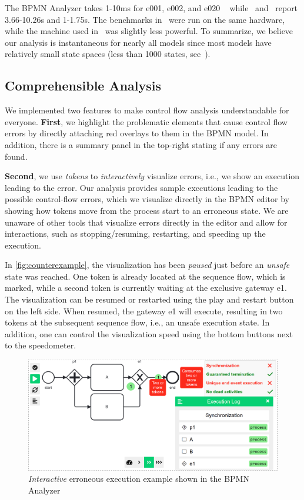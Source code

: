 \documentclass[
twocolumn
]{ceurart}
\begin{document}
The BPMN Analyzer takes 1-10ms for e001, e002, and e020 ~\cite{krauterInstantaneousComprehensibleFixable2024} while~\cite{houhouFirstOrderLogicVerification2022} and~\cite{krauterFormalizationAnalysisBPMN2023} report 3.66-10.26s and 1-1.75s.
The benchmarks in~\cite{krauterFormalizationAnalysisBPMN2023} were run on the same hardware, while the machine used in~\cite{houhouFirstOrderLogicVerification2022} was slightly less powerful.
To summarize, we believe our analysis is instantaneous for nearly all models since most models have relatively small state spaces (less than 1000 states, see~\cite{fahlandAnalysisDemandInstantaneous2011}).

\subsection{Comprehensible Analysis}
We implemented two features to make control flow analysis understandable for everyone. 
\textbf{First}, we highlight the problematic elements that cause control flow errors by directly attaching red overlays to them in the BPMN model.
In addition, there is a summary panel in the top-right stating if any errors are found.

\textbf{Second}, we use \textit{tokens} to \textit{interactively} visualize errors, i.e., we show an execution leading to the error.
Our analysis provides sample executions leading to the possible control-flow errors, which we visualize directly in the BPMN editor by showing how tokens move from the process start to an erroneous state.
We are unaware of other tools that visualize errors directly in the editor and allow for interactions, such as stopping/resuming, restarting, and speeding up the execution.

In \autoref{fig:counterexample}, the visualization has been \textit{paused} just before an \textit{unsafe} state was reached.
One token is already located at the sequence flow, which is marked, while a second token is currently waiting at the exclusive gateway \textsf{e1}.
The visualization can be resumed or restarted using the play and restart button on the left side.
When resumed, the gateway \textsf{e1} will execute, resulting in two tokens at the subsequent sequence flow, i.e., an unsafe execution state.
In addition, one can control the visualization speed using the bottom buttons next to the speedometer.

\begin{figure}[ht]
	\centering
	\includegraphics[width=0.8\linewidth]{images/counter-example}
	\caption{\textit{Interactive} erroneous execution example shown in the BPMN Analyzer}
	\label{fig:counterexample}
\end{figure}
\end{document}

